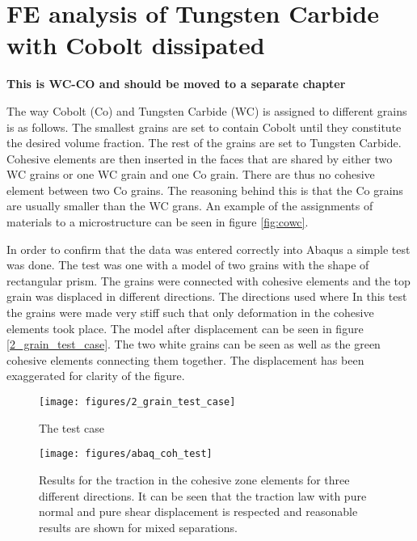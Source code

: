 \documentclass[wcco.tex]{subfiles}
\begin{document}
\FloatBarrier


\section{FE analysis of Tungsten Carbide with Cobolt dissipated }


\textbf{This is WC-CO and should be moved to a separate chapter}

The way Cobolt (Co) and Tungsten Carbide (WC) is assigned to different grains is as follows. The smallest grains are set to contain Cobolt until they constitute the desired volume fraction. The rest of the grains are set to Tungsten Carbide. Cohesive elements are then inserted in the faces that are shared by either two WC grains or one WC grain and one Co grain. There are thus no cohesive element between two Co grains. The reasoning behind this is that the Co grains are usually smaller than the WC grans.  An example of the assignments of materials to a microstructure can be seen in figure \ref{fig:cowc}.



In order to confirm that the data was entered correctly into Abaqus a simple test was done. The test was one with a model of two grains with the shape of rectangular prism. The grains were connected with cohesive elements and the top grain was displaced in different directions. The directions used where  In this test the grains were made very stiff such that only deformation in the cohesive elements took place. The model after displacement can be seen in figure \ref{2_grain_test_case}. The two white grains can be seen as well as the green cohesive elements connecting them together. The displacement has been exaggerated for clarity of the figure.

\begin{figure}[ht]
\centering
\texttt{[image: figures/2\_grain\_test\_case]}
\caption{The test case}
\label{fig:test_case}
\end{figure}


\begin{figure}[ht]
\centering
\texttt{[image: figures/abaq\_coh\_test]}
\caption{Results for the traction in the cohesive zone elements for three different directions. It can be seen that the traction law with pure normal and pure shear displacement is respected and reasonable results are shown for mixed separations. }
\label{fig:test_cases}
\end{figure}
\end{document}
